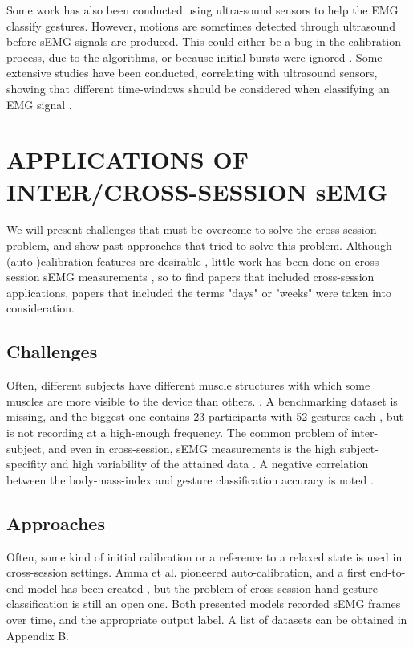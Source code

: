 \documentclass{article}
\begin{document}
Some work has also been conducted using ultra-sound sensors to help the EMG classify gestures. However, motions are sometimes detected through ultrasound before sEMG signals are produced. This could either be a bug in the calibration process, due to the algorithms, or because initial bursts were ignored \cite{Dieterich2017}. Some extensive studies have been conducted, correlating with ultrasound sensors, showing that different time-windows should be considered when classifying an EMG signal \cite{Dieterich2017}. 


\section{APPLICATIONS OF INTER/CROSS-SESSION sEMG}
We will present challenges that must be overcome to solve the cross-session problem, and show past approaches that tried to solve this problem. Although (auto-)calibration features are desirable \cite{Amma2015}, little work has been done on cross-session sEMG measurements \cite{Martinez-Valdes2016}, so to find papers that included cross-session applications, papers that included the terms "days" or "weeks" were taken into consideration.

\subsection{Challenges}
Often, different subjects have different muscle structures with which some muscles are more visible to the device than others. \cite{Martinez-Valdes2016}. A benchmarking dataset is missing, and the biggest one contains 23 participants with 52 gestures each \cite{Du2017}, but is not recording at a high-enough frequency. The common problem of inter-subject, and even in cross-session, sEMG measurements is the high subject-specifity and high variability of the attained data \cite{Castellini2009} \cite{Farina2014}. A negative correlation between the body-mass-index and gesture classification accuracy is noted \cite{Atzori2015} \cite{Holobar2014}.

\subsection{Approaches}
Often, some kind of initial calibration \cite{Saponas2010} or a reference to a relaxed state \cite{Dieterich2017} is used in cross-session settings. Amma et al. \cite{Amma2015} pioneered auto-calibration, and a first end-to-end model has been created \cite{Du2017}, but the problem of cross-session hand gesture classification is still an open one. Both presented models recorded sEMG frames over time, and the appropriate output label. A list of datasets can be obtained in Appendix B. 
\end{document}
